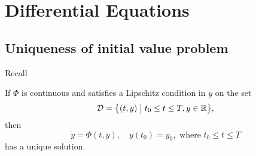 \chapter{Differential Equations}

\section{Uniqueness of initial value problem}
Recall
\begin{theorem}
\label{uniqueivp}
If \(\Phi\) is continuous and satisfies a Lipschitz condition in \(y\) on the set
\[ \mathcal{D} = \Set{(t, y)}{t_0 \leq t \leq T, y\in\R}, \]
then
\[ \dot{y} = \Phi(t, y), \quad  y(t_0) = y_0, \text{ where } t_0 \leq t \leq T \]
has a unique solution.
\end{theorem}
